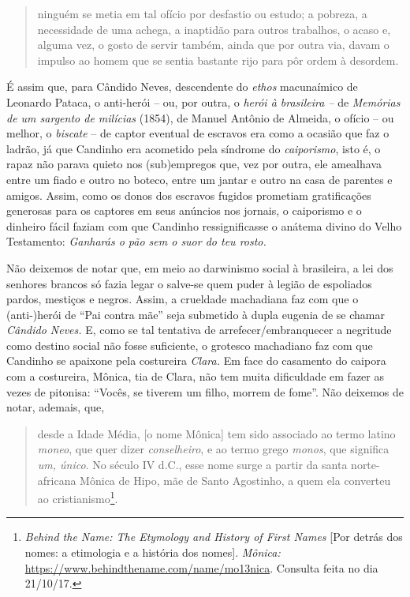 \begin{quote}
ninguém se metia em tal ofício por desfastio ou estudo; a pobreza, a
necessidade de uma achega, a inaptidão para outros trabalhos, o acaso e,
alguma vez, o gosto de servir também, ainda que por outra via, davam o
impulso ao homem que se sentia bastante rijo para pôr ordem à desordem.
\end{quote}

É assim que, para Cândido Neves, descendente do \emph{ethos} macunaímico
de Leonardo Pataca, o anti-herói -- ou, por outra, o \emph{herói à
brasileira --} de \emph{Memórias de um sargento de milícias} (1854), de
Manuel Antônio de Almeida, o ofício -- ou melhor, o \emph{biscate} -- de
captor eventual de escravos era como a ocasião que faz o ladrão, já que
Candinho era acometido pela síndrome do \emph{caiporismo}, isto é, o
rapaz não parava quieto nos (sub)empregos que, vez por outra, ele
amealhava entre um fiado e outro no boteco, entre um jantar e outro na
casa de parentes e amigos. Assim, como os donos dos escravos fugidos
prometiam gratificações generosas para os captores em seus anúncios nos
jornais, o caiporismo e o dinheiro fácil faziam com que Candinho
ressignificasse o anátema divino do Velho Testamento: \emph{Ganharás o
pão sem o suor do teu rosto. }

Não deixemos de notar que, em meio ao darwinismo social à brasileira, a
lei dos senhores brancos só fazia legar o salve-se quem puder à legião
de espoliados pardos, mestiços e negros. Assim, a crueldade machadiana
faz com que o (anti-)herói de ``Pai contra mãe'' seja submetido à dupla
eugenia de se chamar \emph{Cândido Neves.} E, como se tal tentativa de
arrefecer/embranquecer a negritude como destino social não fosse
suficiente, o grotesco machadiano faz com que Candinho se apaixone pela
costureira \emph{Clara.} Em face do casamento do caipora com a
costureira, Mônica, tia de Clara, não tem muita dificuldade em fazer as
vezes de pitonisa: ``Vocês, se tiverem um filho, morrem de fome''. Não
deixemos de notar, ademais, que,

\begin{quote}
desde a Idade Média, {[}o nome Mônica{]} tem sido associado ao termo
latino \emph{moneo}, que quer dizer \emph{conselheiro}, e ao termo grego
\emph{monos}, que significa \emph{um, único}. No século IV d.C., esse
nome surge a partir da santa norte-africana Mônica de Hipo, mãe de Santo
Agostinho, a quem ela converteu ao cristianismo\footnote{\emph{Behind
  the Name: The Etymology and History of First Names} {[}Por detrás dos
  nomes: a etimologia e a história dos nomes{]}. \emph{Mônica:}
  \href{https://www.behindthename.com/name/mo13nica}{{https://www.behindthename.com/name/mo13nica}}.
  Consulta feita no dia 21/10/17.}.
\end{quote}

